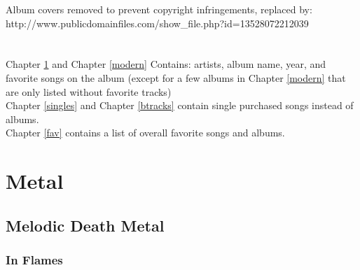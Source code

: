 Album covers removed to prevent copyright infringements, replaced by:\\ http://www.publicdomainfiles.com/show\_file.php?id=13528072212039\\
\ \\
\ \\
Chapter \ref{metal} and Chapter \ref{modern} Contains: artists, album name, year, and favorite songs on the album (except for a few albums in Chapter \ref{modern} that are only listed without favorite tracks)\\
Chapter \ref{singles} and Chapter \ref{btracks} contain single purchased songs instead of albums.\\
Chapter \ref{fav} contains a list of overall favorite songs and albums.\\

\chapter{Metal}\label{metal}

\section{Melodic Death Metal}

\subsection{In Flames}

